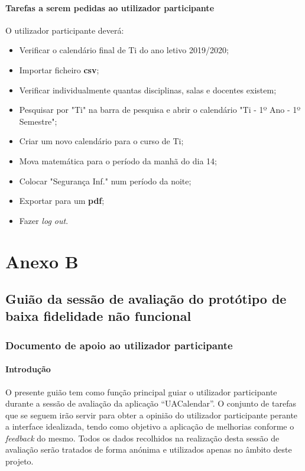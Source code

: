 \documentclass[11pt, twoside]{report}
\begin{document}
	\subsubsection*{Tarefas a serem pedidas ao utilizador participante}	
	O utilizador participante deverá:
	
		\begin{itemize}
			\item Verificar o calendário final de Ti do ano letivo 2019/2020;
			\item Importar ficheiro \textbf{csv};
			\item Verificar individualmente quantas disciplinas, salas e docentes existem;
			\item Pesquisar por "Ti" na barra de pesquisa e abrir o calendário "Ti - 1º Ano - 1º Semestre";
			\item Criar um novo calendário para o curso de Ti;
			\item Mova matemática para o período da manhã do dia 14;
			\item Colocar "Segurança Inf." num período da noite;
			\item Exportar para um \textbf{pdf};
			\item Fazer \textit{log out}.
		\end{itemize}
	
	
	\chapter*{Anexo B}
		\section*{Guião da sessão de avaliação do protótipo de baixa fidelidade não funcional}
		\subsection*{Documento de apoio ao utilizador participante}
			
		
		\subsubsection*{Introdução}
			O presente guião tem como função principal guiar o utilizador participante durante a sessão de avaliação da aplicação “UACalendar”. O conjunto de tarefas que se seguem irão servir para obter a opinião do utilizador participante perante a interface idealizada, tendo como objetivo a aplicação de melhorias conforme o \textit{feedback} do mesmo. Todos os dados recolhidos na realização desta sessão de avaliação serão tratados de forma anónima e utilizados apenas no âmbito deste projeto.
	
\end{document}
